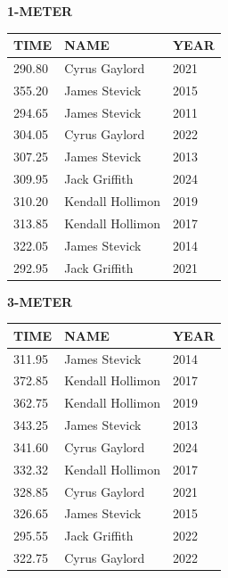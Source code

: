 \begin{table}[H]
\centering
\begin{minipage}[t]{0.6\textwidth}
\centering
\textbf{1-METER}\\[0.1cm]
\begin{tabular}{@{}p{1.8cm}p{2.8cm}p{1.2cm}@{}}
\hline
    \textbf{TIME} & \textbf{NAME} & \textbf{YEAR} \\
\hline
    290.80 & Cyrus Gaylord & 2021 \\
    355.20 & James Stevick & 2015 \\
    294.65 & James Stevick & 2011 \\
    304.05 & Cyrus Gaylord & 2022 \\
    307.25 & James Stevick & 2013 \\
    309.95 & Jack Griffith & 2024 \\
    310.20 & Kendall Hollimon & 2019 \\
    313.85 & Kendall Hollimon & 2017 \\
    322.05 & James Stevick & 2014 \\
    292.95 & Jack Griffith & 2021 \\
\hline
\end{tabular}
\end{minipage}
\end{table}

\begin{table}[H]
\centering
\begin{minipage}[t]{0.6\textwidth}
\centering
\textbf{3-METER}\\[0.1cm]
\begin{tabular}{@{}p{1.8cm}p{2.8cm}p{1.2cm}@{}}
\hline
    \textbf{TIME} & \textbf{NAME} & \textbf{YEAR} \\
\hline
    311.95 & James Stevick & 2014 \\
    372.85 & Kendall Hollimon & 2017 \\
    362.75 & Kendall Hollimon & 2019 \\
    343.25 & James Stevick & 2013 \\
    341.60 & Cyrus Gaylord & 2024 \\
    332.32 & Kendall Hollimon & 2017 \\
    328.85 & Cyrus Gaylord & 2021 \\
    326.65 & James Stevick & 2015 \\
    295.55 & Jack Griffith & 2022 \\
    322.75 & Cyrus Gaylord & 2022 \\
\hline
\end{tabular}
\end{minipage}
\end{table}

